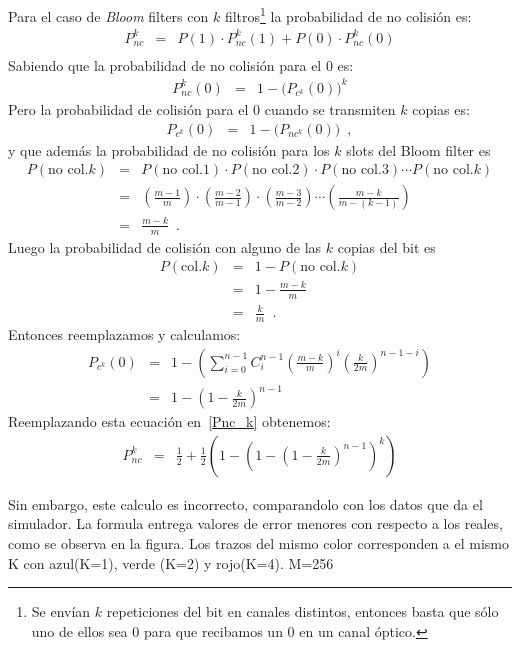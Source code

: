 \noindent Para el caso de {\em Bloom} filters con $k$ filtros\footnote{Se envían $k$ repeticiones del bit en canales distintos, entonces basta que sólo uno de ellos sea 0 para que recibamos un 0 en un canal óptico.} la probabilidad de no colisión es:
\begin{eqnarray} 
P_{nc}^{k} & = &  P(1) \cdot P_{nc}^{k}(1) + P(0) \cdot P_{nc}^{k}(0)\\ \label{Pnc_k}
\end{eqnarray}
Sabiendo que la probabilidad de no colisión para el 0 es:
\begin{eqnarray}
P_{nc}^{k}(0) & = & 1 - \big(P_{c^k}(0)\big)^k 
\end{eqnarray}
Pero la probabilidad de colisión para el 0 cuando se transmiten $k$ copias es:
\begin{eqnarray}
P_{c^k}(0) & = & 1 - \big(P_{nc^k}(0)\big)  \enspace,
\end{eqnarray}
y que además la probabilidad de no colisión para los $k$ slots del Bloom
filter es
\begin{eqnarray}
P(\mbox{no col.} k) &=& P(\mbox{no col.}1)\cdot P(\mbox{no col.}2)\cdot P(\mbox{no col.}3)\cdots P(\mbox{no col.}k)\\
&=&\left(\frac{m-1}{m}\right)\cdot\left(\frac{m-2}{m-1}\right)\cdot\left(\frac{m-3}{m-2}\right)\cdots\left(\frac{m-k}{m-(k-1)}\right)\\
&=& \frac{m-k}{m} \enspace.
\end{eqnarray}
Luego la probabilidad de colisión con alguno de las $k$ copias del bit es
\begin{eqnarray}
P(\mbox{col.}k)&=& 1-P(\mbox{no col.} k)\\
&=& 1-\frac{m-k}{m}\\
&=& \frac{k}{m} \enspace.
\end{eqnarray}
Entonces reemplazamos y calculamos:
\begin{eqnarray}
P_{c^k}(0) & = & 1 - \left(\sum_{i=0}^{n-1} C^{n-1}_{i} \left(\frac{m-k}{m}\right)^i \left(\frac{k}{2m}\right)^{n-1-i} \right)  \\
& = &  1-\left( 1-\frac{k}{2m}\right)^{n-1}
\end{eqnarray}
Reemplazando esta ecuación en~\ref{Pnc_k} obtenemos:
\begin{eqnarray}
P_{nc}^k & = & \frac{1}{2} + \frac{1}{2} \left( 1- \left( 1- \left( 1- \frac{k}{2m} \right)^{n-1}  \right)^{k}  \right) 
\end{eqnarray}

Sin embargo, este calculo es incorrecto, comparandolo con los datos que da el simulador. La formula entrega valores de error menores con respecto a los reales, como se observa en la figura. 
Los trazos del mismo color corresponden a el mismo K con azul(K=1), verde (K=2) y rojo(K=4). M=256

